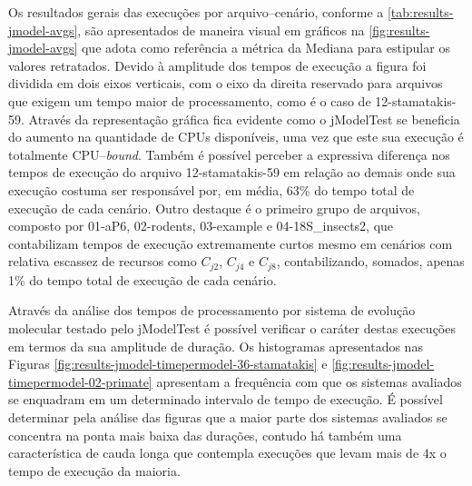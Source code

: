 \documentclass[english,brazilian]{UNISINOSmonografia} %
\begin{document}
{\begin{figure}[bt]
\begin{minipage}{.52\textwidth}
	\end{minipage}
\end{figure}
}



Os resultados gerais das execuções por arquivo--cenário, conforme a \autoref{tab:results-jmodel-avgs}, são apresentados de maneira visual em gráficos na \autoref{fig:results-jmodel-avgs} que adota como referência a métrica da Mediana para estipular os valores retratados.
%
Devido à amplitude dos tempos de execução a figura foi dividida em dois eixos verticais, com o eixo da direita reservado para arquivos que exigem um tempo maior de processamento, como é o caso de 12-stamatakis-59.
%
Através da representação gráfica fica evidente como o jModelTest se beneficia do aumento na quantidade de CPUs disponíveis, uma vez que este sua execução é totalmente CPU--\textit{bound}.
%
Também é possível perceber a expressiva diferença nos tempos de execução do arquivo 12-stamatakis-59 em relação ao demais onde sua execução costuma ser responsável por, em média, 63\% do tempo total de execução de cada cenário.
%
Outro destaque é o primeiro grupo de arquivos, composto por 01-aP6, 02-rodents, 03-example e 04-18S\_insects2, que contabilizam tempos de execução extremamente curtos mesmo em cenários com relativa escassez de recursos como $C_{j2}$, $C_{j4}$ e $C_{j8}$, contabilizando, somados, apenas 1\% do tempo total de execução de cada cenário.


Através da análise dos tempos de processamento por sistema de evolução molecular testado pelo jModelTest é possível verificar o caráter destas execuções em termos da sua amplitude de duração.
%
Os histogramas apresentados nas Figuras \ref{fig:results-jmodel-timepermodel-36-stamatakis} e \ref{fig:results-jmodel-timepermodel-02-primate} apresentam a frequência com que os sistemas avaliados se enquadram em um determinado intervalo de tempo de execução.
%
É possível determinar pela análise das figuras que a maior parte dos sistemas avaliados se concentra na ponta mais baixa das durações, contudo há também uma característica de cauda longa que contempla execuções que levam mais de 4x o tempo de execução da maioria.
\end{document}
